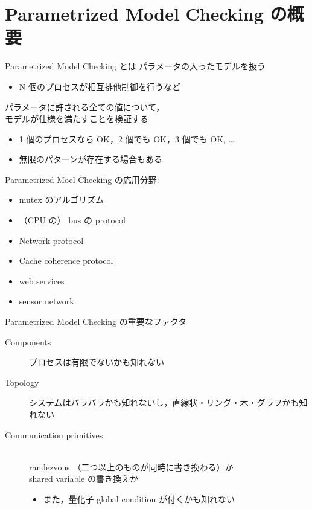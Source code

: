 \documentclass[presentation, xetex]{beamer}
\begin{document}
\section{Parametrized Model Checking の概要}
\label{sec:org0a0b686}

\begin{frame}[label={sec:org078ecdb}]{Parametrized Model Checking とは}
パラメータの入ったモデルを扱う
\begin{itemize}
\item N 個のプロセスが相互排他制御を行うなど
\end{itemize}


パラメータに許される全ての値について，\\
モデルが仕様を満たすことを検証する
\begin{itemize}
\item 1 個のプロセスなら OK，2 個でも OK，3 個でも OK, \ldots{}
\item 無限のパターンが存在する場合もある
\end{itemize}
\end{frame}


\begin{frame}[label={sec:org567a4f8}]{Parametrized Moel Checking の応用分野:}
\begin{itemize}
\item mutex のアルゴリズム
\item （CPU の） bus の protocol
\item Network protocol
\item Cache coherence protocol
\item web services
\item sensor network
\end{itemize}
\end{frame}


\begin{frame}[label={sec:orgdbfc4c2}]{Parametrized Model Checking の重要なファクタ}
\begin{description}
\item[{Components}] プロセスは有限でないかも知れない
\item[{Topology}] システムはバラバラかも知れないし，直線状・リング・木・グラフかも知れない
\item[{Communication primitives}] \mbox{}\\
randezvous （二つ以上のものが同時に書き換わる）か\\
shared variable の書き換えか
\begin{itemize}
\item また，量化子 \alert{\alert{global condition}} が付くかも知れない
\end{itemize}
\end{description}
\end{frame}
\end{document}

